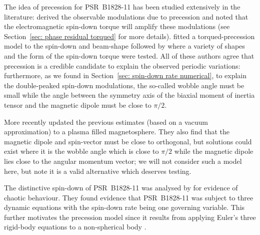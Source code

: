 \documentclass[../full_thesis/full_thesis.tex]{subfiles}
\begin{document}
The idea of precession for PSR~B1828-11 has been studied extensively in the
literature: \citet{Jones2001} derived the observable modulations due to
precession and noted that the electromagnetic spin-down torque will amplify
these modulations (see Section~\ref{sec: phase residual torqued} for more
details).  \citet{Link2001} fitted a torqued-precession model to the spin-down
and beam-shape followed by \citet{Akgun2006} where a variety of shapes and the
form of the spin-down torque were tested.  All of these authors agree that
precession is a credible candidate to explain the observed periodic variations:
furthermore, as we found in Section~\ref{sec: spin-down rate numerical}, to explain
the double-peaked spin-down modulations, the so-called wobble angle must be
small while the angle between the symmetry axis of the biaxial moment of
inertia tensor and the magnetic dipole must be close to $\pi/2$.

More recently \citet{Arzamasskiy2015} updated the previous estimates (based on
a vacuum approximation) to a plasma filled magnetosphere. They also find that
the magnetic dipole and spin-vector must be close to orthogonal, but solutions
could exist where it is the wobble angle which is close to $\pi/2$ while the
magnetic dipole lies close to the angular momentum vector; we will not consider
such a model here, but note it is a valid alternative which deserves testing.

The distinctive spin-down of PSR~B1828-11 was analysed by \citet{Seymour2013} for
evidence of chaotic behaviour. They found evidence that PSR~B1828-11 was subject to
three dynamic equations with the spin-down rate being one governing variable.
This further motivates the precession model since it results from applying
Euler's three rigid-body equations to a non-spherical body \citep{Landau1969}.
\end{document}
